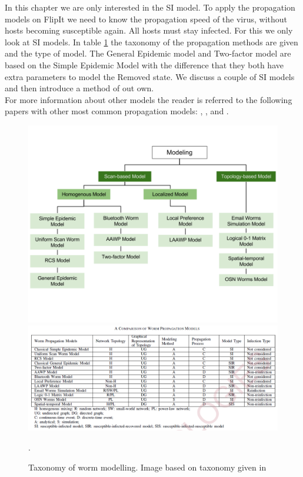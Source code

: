 In this chapter we are only interested in the SI model. To apply the propagation models on FlipIt we need to know the propagation speed of the virus, without hosts becoming susceptible again. All hosts must stay infected. For this we only look at SI models. In table \ref{tree} the taxonomy of the propagation methods are given and the type of model. The General Epidemic model and Two-factor model are based on the Simple Epidemic Model with the difference that they both have extra parameters to model the Removed state.  We discuss a couple of SI models and then introduce a method of out own.\\

For more information about other models the reader is referred to the following papers with other most common propagation models: \cite{wang2014modeling}, \cite{OnWorms2005survey}, \cite{xiang2009propagation} and \cite{serazzi2004computer}.


\begin{figure}
\centering
\includegraphics[scale=0.4]{Images/tabel3.png} 
\includegraphics[scale=0.55]{Images/tableworms.png}
\caption{Taxonomy of worm modelling. Image based on taxonomy given in \cite{wang2014modeling}}.
\label{tree}
\end{figure}


